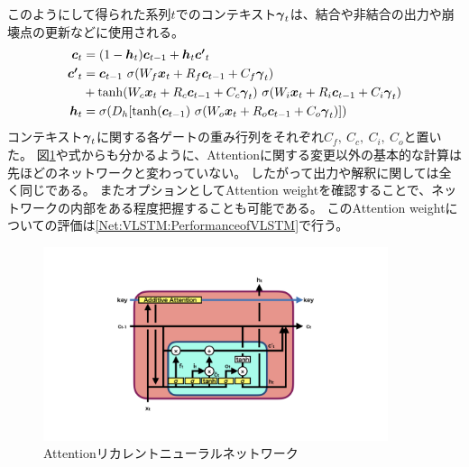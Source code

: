 このようにして得られた系列$t$でのコンテキスト${\mbox{\boldmath{$\gamma$}}}_{t}$は、結合や非結合の出力や崩壊点の更新などに使用される。
\begin{equation}
 \begin{split}
  {\mbox{\boldmath{$c$}}}_{t} 
  &= (1-{\mbox{\boldmath{$h$}}}_t) {\mbox{\boldmath{$c$}}}_{t-1} + {\mbox{\boldmath{$h$}}}_t {\mbox{\boldmath{$c'$}}}_{t}\\
  {\mbox{\boldmath{$c'$}}}_{t}
  &= {\mbox{\boldmath{$c$}}}_{t-1} \  \sigma (W_f {\mbox{\boldmath{$x$}}}_t + R_f {\mbox{\boldmath{$c$}}}_{t-1} + C_f {\mbox{\boldmath{$\gamma$}}}_{t})\\
  &+ \tanh (W_c {\mbox{\boldmath{$x$}}}_t + R_c {\mbox{\boldmath{$c$}}}_{t-1} + C_c {\mbox{\boldmath{$\gamma$}}}_{t}) \  \sigma (W_i {\mbox{\boldmath{$x$}}}_t + R_i {\mbox{\boldmath{$c$}}}_{t-1} + C_i {\mbox{\boldmath{$\gamma$}}}_{t})\\
  {\mbox{\boldmath{$h$}}}_{t} 
  &= \sigma (D_h [\tanh({\mbox{\boldmath{$c$}}}_{t-1}) \  \sigma (W_o {\mbox{\boldmath{$x$}}}_t + R_o {\mbox{\boldmath{$c$}}}_{t-1} + C_o {\mbox{\boldmath{$\gamma$}}}_{t}) ])
 \end{split}
\end{equation}
コンテキスト${\mbox{\boldmath{$\gamma$}}}_{t}$に関する各ゲートの重み行列をそれぞれ$C_f,\ C_c,\ C_i,\ C_o$と置いた。
図\ref{3-4-2-2AttentionVLSTM}や式からも分かるように、Attentionに関する変更以外の基本的な計算は先ほどのネットワークと変わっていない。
したがって出力や解釈に関しては全く同じである。
またオプションとしてAttention weightを確認することで、ネットワークの内部をある程度把握することも可能である。
このAttention weightについての評価は\ref{Net:VLSTM:PerformanceofVLSTM}で行う。

\begin{figure}[htbp]
 \centering
 \includegraphics[trim = 100 100 100 150, width=0.9\textwidth, clip]{Figure/3Networks/3-4-2-2AttentionVLSTM.png}
 \caption{Attentionリカレントニューラルネットワーク}
 \label{3-4-2-2AttentionVLSTM}
\end{figure}


